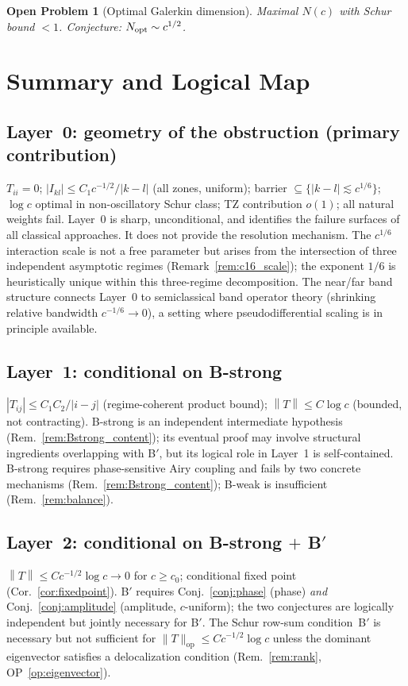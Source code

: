 \documentclass[12pt,a4paper]{article}
\newtheorem{openproblem}[theorem]{Open Problem}
\newcommand{\norm}[1]{\left\|#1\right\|}
\begin{document}
\begin{openproblem}[Optimal Galerkin dimension]\label{op:Nopt}
Maximal $N(c)$ with Schur bound $<1$.
Conjecture: $N_{\rm opt}\sim c^{1/2}$.
\end{openproblem}

\section{Summary and Logical Map}
\label{sec:summary}

\subsection*{Layer~0: geometry of the obstruction (primary contribution)}
$T_{ii}=0$;\;
$|I_{kl}|\leq C_1c^{-1/2}/|k-l|$ (all zones, uniform);
barrier $\subseteq\{|k-l|\lesssim c^{1/6}\}$;\;
$\log c$ optimal in non-oscillatory Schur class;
TZ contribution $o(1)$;\;
all natural weights fail.
Layer~0 is sharp, unconditional, and identifies the failure
surfaces of all classical approaches.
It does not provide the resolution mechanism.
The $c^{1/6}$ interaction scale is not a free parameter but
arises from the intersection of three independent asymptotic
regimes (Remark~\ref{rem:c16_scale}); the exponent $1/6$
is heuristically unique within this three-regime decomposition.
The near/far band structure connects Layer~0 to semiclassical
band operator theory (shrinking relative bandwidth $c^{-1/6}\to0$),
a setting where pseudodifferential scaling is in principle available.

\subsection*{Layer~1: conditional on B-strong}
$|T_{ij}|\leq C_1C_2/|i-j|$ (regime-coherent product bound);\;
$\norm{T}\leq C\log c$ (bounded, not contracting).
B-strong is an independent intermediate hypothesis
(Rem.~\ref{rem:Bstrong_content});
its eventual proof may involve structural ingredients
overlapping with B$'$, but its logical role in Layer~1
is self-contained.
B-strong requires phase-sensitive Airy coupling and fails by
two concrete mechanisms (Rem.~\ref{rem:Bstrong_content});
B-weak is insufficient (Rem.~\ref{rem:balance}).

\subsection*{Layer~2: conditional on B-strong $+$ B$'$}
$\norm{T}\leq Cc^{-1/2}\log c\to0$ for $c\geq c_0$;\;
conditional fixed point (Cor.~\ref{cor:fixedpoint}).
B$'$ requires Conj.~\ref{conj:phase} (phase) \emph{and}
Conj.~\ref{conj:amplitude} (amplitude, $c$-uniform);
the two conjectures are logically independent but
jointly necessary for B$'$.
The Schur row-sum condition~B$'$ is necessary but not sufficient
for $\|T\|_{\mathrm{op}}\leq Cc^{-1/2}\log c$ unless the
dominant eigenvector satisfies a delocalization condition
(Rem.~\ref{rem:rank}, OP~\ref{op:eigenvector}).
\end{document}
